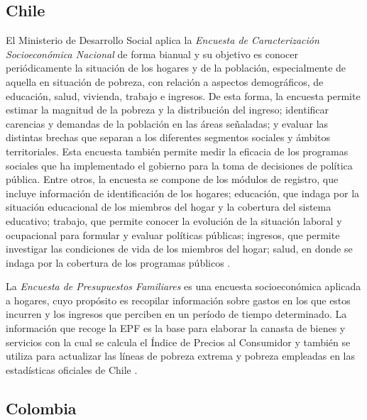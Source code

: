 \documentclass[
  12pt,
  spanish,
]{book}
\begin{document}
\hypertarget{chile}{%
\subsection{Chile}\label{chile}}

El Ministerio de Desarrollo Social aplica la \emph{Encuesta de Caracterización Socioeconómica Nacional} de forma bianual y su objetivo es conocer periódicamente la situación de los hogares y de la población, especialmente de aquella en situación de pobreza, con relación a aspectos demográficos, de educación, salud, vivienda, trabajo e ingresos. De esta forma, la encuesta permite estimar la magnitud de la pobreza y la distribución del ingreso; identificar carencias y demandas de la población en las áreas señaladas; y evaluar las distintas brechas que separan a los diferentes segmentos sociales y ámbitos territoriales. Esta encuesta también permite medir la eficacia de los programas sociales que ha implementado el gobierno para la toma de decisiones de política pública. Entre otros, la encuesta se compone de los módulos de registro, que incluye información de identificación de los hogares; educación, que indaga por la situación educacional de los miembros del hogar y la cobertura del sistema educativo; trabajo, que permite conocer la evolución de la situación laboral y ocupacional para formular y evaluar políticas públicas; ingresos, que permite investigar las condiciones de vida de los miembros del hogar; salud, en donde se indaga por la cobertura de los programas públicos \citep{MDS-CL_2015}.

La \emph{Encuesta de Presupuestos Familiares} es una encuesta socioeconómica aplicada a hogares, cuyo propósito es recopilar información sobre gastos en los que estos incurren y los ingresos que perciben en un período de tiempo determinado. La información que recoge la EPF es la base para elaborar la canasta de bienes y servicios con la cual se calcula el Índice de Precios al Consumidor y también se utiliza para actualizar las líneas de pobreza extrema y pobreza empleadas en las estadísticas oficiales de Chile \citep{INE_CL}.

\hypertarget{colombia}{%
\subsection{Colombia}\label{colombia}}
\end{document}
